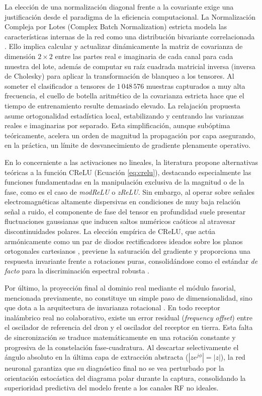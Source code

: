 La elección de una normalización diagonal frente a la covariante exige una justificación desde el paradigma de la eficiencia computacional. La Normalización Compleja por Lotes (Complex Batch Normalization) estricta modela las características internas de la red como una distribución bivariante correlacionada \cite{trabelsi_deep_2018}. Ello implica calcular y actualizar dinámicamente la matriz de covarianza de dimensión $2 \times 2$ entre las partes real e imaginaria de cada canal para cada muestra del lote, además de computar su raíz cuadrada matricial inversa (inversa de Cholesky) para aplicar la transformación de blanqueo a los tensores. Al someter el clasificador a tensores de $1\,048\,576$ muestras capturados a muy alta frecuencia, el cuello de botella aritmético de la covarianza estricta hace que el tiempo de entrenamiento resulte demasiado elevado. La relajación propuesta asume ortogonalidad estadística local, estabilizando y centrando las varianzas reales e imaginarias por separado. Esta simplificación, aunque subóptima teóricamente, acelera un orden de magnitud la propagación por capa asegurando, en la práctica, un límite de desvanecimiento de gradiente plenamente operativo.

En lo concerniente a las activaciones no lineales, la literatura propone alternativas teóricas a la función CReLU (Ecuación \ref{eq:crelu}), destacando especialmente las funciones fundamentadas en la manipulación exclusiva de la magnitud o de la fase, como es el caso de \textit{modReLU} o \textit{zReLU}. Sin embargo, al operar sobre señales electromagnéticas altamente dispersivas en condiciones de muy baja relación señal a ruido, el componente de fase del tensor en profundidad suele presentar fluctuaciones gaussianas que inducen saltos numéricos caóticos al atravesar discontinuidades polares. La elección empírica de CReLU, que actúa armónicamente como un par de diodos rectificadores ideados sobre los planos ortogonales cartesianos \cite{trabelsi_deep_2018}, previene la saturación del gradiente y proporciona una respuesta invariante frente a rotaciones puras, consolidándose como el estándar \textit{de facto} para la discriminación espectral robusta \cite{bassey_survey_2021}.

Por último, la proyección final al dominio real mediante el módulo fasorial, mencionada previamente, no constituye un simple paso de dimensionalidad, sino que dota a la arquitectura de invarianza rotacional \cite{hirose_complex_2012}. En todo receptor inalámbrico real no colaborativo, existe un error residual (\textit{frequency offset}) entre el oscilador de referencia del dron y el oscilador del receptor en tierra. Esta falta de sincronización se traduce matemáticamente en una rotación constante y progresiva de la constelación fase-cuadratura. Al descartar selectivamente el ángulo absoluto en la última capa de extracción abstracta ($|z e^{j\phi}| = |z|$), la red neuronal garantiza que su diagnóstico final no se vea perturbado por la orientación estocástica del diagrama polar durante la captura, consolidando la superioridad predictiva del modelo frente a los canales RF no ideales.

